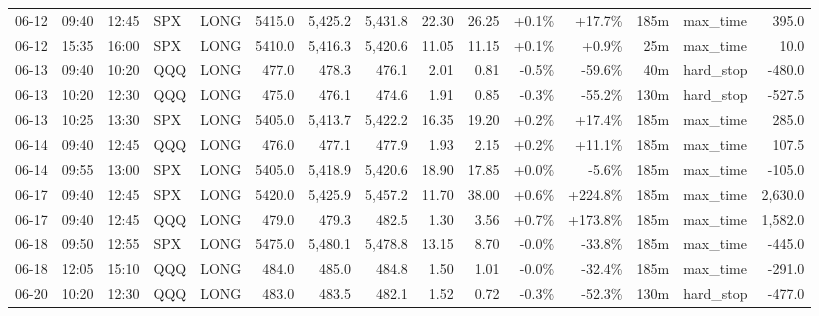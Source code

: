 \documentclass[11pt,a4paper,twoside]{article}
\begin{document}
\begin{landscape}
\begin{center}
\begin{longtable}{>{\color{txtmain}}l l l l l r r r r r r r r >{\color{txtmain}}l r}
06-12 & 09:40 & 12:45 & SPX & LONG & 5415.0 & 5,425.2 & 5,431.8 & 22.30 & 26.25 & \textcolor{wingreen}{+0.1\%} & \textcolor{wingreen}{+17.7\%} & 185m & max\_time & \textcolor{wingreen}{395.0} \\
06-12 & 15:35 & 16:00 & SPX & LONG & 5410.0 & 5,416.3 & 5,420.6 & 11.05 & 11.15 & \textcolor{wingreen}{+0.1\%} & \textcolor{wingreen}{+0.9\%} & 25m & max\_time & \textcolor{wingreen}{10.0} \\
06-13 & 09:40 & 10:20 & QQQ & LONG & 477.0 & 478.3 & 476.1 & 2.01 & 0.81 & \textcolor{lossred}{-0.5\%} & \textcolor{lossred}{-59.6\%} & 40m & hard\_stop & \textcolor{lossred}{-480.0} \\
06-13 & 10:20 & 12:30 & QQQ & LONG & 475.0 & 476.1 & 474.6 & 1.91 & 0.85 & \textcolor{lossred}{-0.3\%} & \textcolor{lossred}{-55.2\%} & 130m & hard\_stop & \textcolor{lossred}{-527.5} \\
06-13 & 10:25 & 13:30 & SPX & LONG & 5405.0 & 5,413.7 & 5,422.2 & 16.35 & 19.20 & \textcolor{wingreen}{+0.2\%} & \textcolor{wingreen}{+17.4\%} & 185m & max\_time & \textcolor{wingreen}{285.0} \\
06-14 & 09:40 & 12:45 & QQQ & LONG & 476.0 & 477.1 & 477.9 & 1.93 & 2.15 & \textcolor{wingreen}{+0.2\%} & \textcolor{wingreen}{+11.1\%} & 185m & max\_time & \textcolor{wingreen}{107.5} \\
06-14 & 09:55 & 13:00 & SPX & LONG & 5405.0 & 5,418.9 & 5,420.6 & 18.90 & 17.85 & \textcolor{wingreen}{+0.0\%} & \textcolor{lossred}{-5.6\%} & 185m & max\_time & \textcolor{lossred}{-105.0} \\
06-17 & 09:40 & 12:45 & SPX & LONG & 5420.0 & 5,425.9 & 5,457.2 & 11.70 & 38.00 & \textcolor{wingreen}{+0.6\%} & \textcolor{wingreen}{+224.8\%} & 185m & max\_time & \textcolor{wingreen}{2,630.0} \\
06-17 & 09:40 & 12:45 & QQQ & LONG & 479.0 & 479.3 & 482.5 & 1.30 & 3.56 & \textcolor{wingreen}{+0.7\%} & \textcolor{wingreen}{+173.8\%} & 185m & max\_time & \textcolor{wingreen}{1,582.0} \\
06-18 & 09:50 & 12:55 & SPX & LONG & 5475.0 & 5,480.1 & 5,478.8 & 13.15 & 8.70 & \textcolor{lossred}{-0.0\%} & \textcolor{lossred}{-33.8\%} & 185m & max\_time & \textcolor{lossred}{-445.0} \\
06-18 & 12:05 & 15:10 & QQQ & LONG & 484.0 & 485.0 & 484.8 & 1.50 & 1.01 & \textcolor{lossred}{-0.0\%} & \textcolor{lossred}{-32.4\%} & 185m & max\_time & \textcolor{lossred}{-291.0} \\
06-20 & 10:20 & 12:30 & QQQ & LONG & 483.0 & 483.5 & 482.1 & 1.52 & 0.72 & \textcolor{lossred}{-0.3\%} & \textcolor{lossred}{-52.3\%} & 130m & hard\_stop & \textcolor{lossred}{-477.0} \\

\end{longtable}
\end{center}
\end{landscape}
\end{document}
